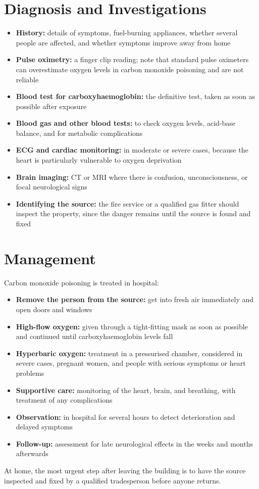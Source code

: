 \section*{Diagnosis and Investigations}
\begin{itemize}
    \item \textbf{History:} details of symptoms, fuel-burning appliances, whether several people are affected, and whether symptoms improve away from home
    \item \textbf{Pulse oximetry:} a finger clip reading; note that standard pulse oximeters can overestimate oxygen levels in carbon monoxide poisoning and are not reliable
    \item \textbf{Blood test for carboxyhaemoglobin:} the definitive test, taken as soon as possible after exposure
    \item \textbf{Blood gas and other blood tests:} to check oxygen levels, acid-base balance, and for metabolic complications
    \item \textbf{ECG and cardiac monitoring:} in moderate or severe cases, because the heart is particularly vulnerable to oxygen deprivation
    \item \textbf{Brain imaging:} CT or MRI where there is confusion, unconsciousness, or focal neurological signs
    \item \textbf{Identifying the source:} the fire service or a qualified gas fitter should inspect the property, since the danger remains until the source is found and fixed
\end{itemize}

\section*{Management}
Carbon monoxide poisoning is treated in hospital:
\begin{itemize}
    \item \textbf{Remove the person from the source:} get into fresh air immediately and open doors and windows
    \item \textbf{High-flow oxygen:} given through a tight-fitting mask as soon as possible and continued until carboxyhaemoglobin levels fall
    \item \textbf{Hyperbaric oxygen:} treatment in a pressurised chamber, considered in severe cases, pregnant women, and people with serious symptoms or heart problems
    \item \textbf{Supportive care:} monitoring of the heart, brain, and breathing, with treatment of any complications
    \item \textbf{Observation:} in hospital for several hours to detect deterioration and delayed symptoms
    \item \textbf{Follow-up:} assessment for late neurological effects in the weeks and months afterwards
\end{itemize}
At home, the most urgent step after leaving the building is to have the source inspected and fixed by a qualified tradesperson before anyone returns.


